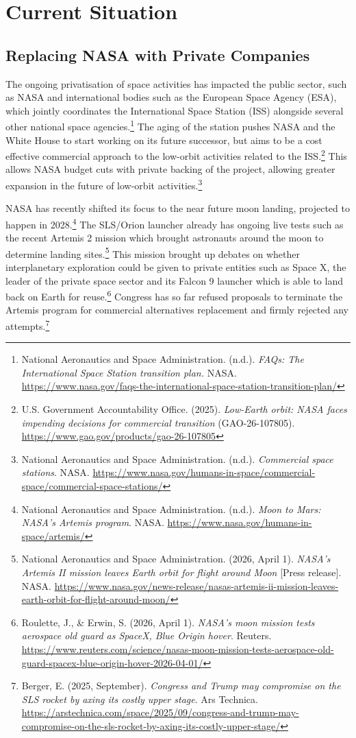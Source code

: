 \section{Current Situation}

\subsection{Replacing NASA with Private Companies}

The ongoing privatisation of space activities has impacted the public sector, such as NASA and international bodies such as the European Space Agency (ESA), which jointly coordinates the International Space Station (ISS) alongside several other national space agencies.\footnote{National Aeronautics and Space Administration. (n.d.). \emph{FAQs: The International Space Station transition plan.} NASA. \url{https://www.nasa.gov/faqs-the-international-space-station-transition-plan/}} The aging of the station pushes NASA and the White House to start working on its future successor, but aims to be a cost effective commercial approach to the low-orbit activities related to the ISS.\footnote{U.S. Government Accountability Office. (2025). \emph{Low-Earth orbit: NASA faces impending decisions for commercial transition} (GAO-26-107805). \url{https://www.gao.gov/products/gao-26-107805}} This allows NASA budget cuts with private backing of the project, allowing greater expansion in the future of low-orbit activities.\footnote{National Aeronautics and Space Administration. (n.d.). \emph{Commercial space stations}. NASA. \url{https://www.nasa.gov/humans-in-space/commercial-space/commercial-space-stations/}}

NASA has recently shifted its focus to the near future moon landing, projected to happen in 2028.\footnote{National Aeronautics and Space Administration. (n.d.). \emph{Moon to Mars: NASA's Artemis program}. NASA. \url{https://www.nasa.gov/humans-in-space/artemis/}} The SLS/Orion launcher already has ongoing live tests such as the recent Artemis 2 mission which brought astronauts around the moon to determine landing sites.\footnote{National Aeronautics and Space Administration. (2026, April 1). \emph{NASA's Artemis II mission leaves Earth orbit for flight around Moon} [Press release]. NASA. \url{https://www.nasa.gov/news-release/nasas-artemis-ii-mission-leaves-earth-orbit-for-flight-around-moon/}} This mission brought up debates on whether interplanetary exploration could be given to private entities such as Space X, the leader of the private space sector and its Falcon 9 launcher which is able to land back on Earth for reuse.\footnote{Roulette, J., \& Erwin, S. (2026, April 1). \emph{NASA's moon mission tests aerospace old guard as SpaceX, Blue Origin hover}. Reuters. \url{https://www.reuters.com/science/nasas-moon-mission-tests-aerospace-old-guard-spacex-blue-origin-hover-2026-04-01/}} Congress has so far refused proposals to terminate the Artemis program for commercial alternatives replacement and firmly rejected any attempts.\footnote{Berger, E. (2025, September). \emph{Congress and Trump may compromise on the SLS rocket by axing its costly upper stage}. Ars Technica. \url{https://arstechnica.com/space/2025/09/congress-and-trump-may-compromise-on-the-sls-rocket-by-axing-its-costly-upper-stage/}}

